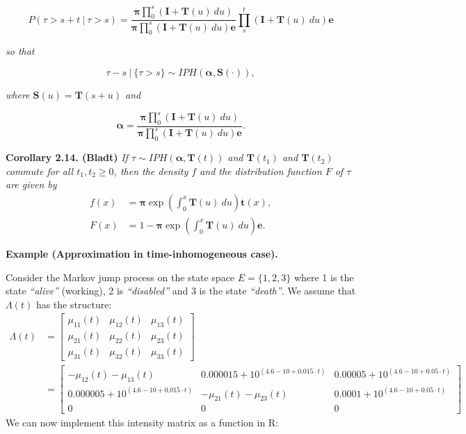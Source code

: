 \documentclass[a4paper,10pt,openany]{book}
\begin{document}
\[
P(\tau >s+t\ \vert\ \tau >s)=\frac{\mathbf{\pi}\prod_0^s(\mathbf{I}+\mathbf{T}(u)\ du)}{\mathbf{\pi}\prod_0^s(\mathbf{I}+\mathbf{T}(u)\ du)\mathbf{e}}\prod_s^t(\mathbf{I}+\mathbf{T}(u)\ du)\mathbf{e}
\]

\emph{so that}

\[
\tau-s\ \vert\ \{\tau>s\}\sim IPH(\mathbf{\alpha},\mathbf{S}(\cdot)),
\]

\emph{where \(\mathbf{S}(u)=\mathbf{T}(s+u)\) and }

\[
\mathbf{\alpha}=\frac{\mathbf{\pi}\prod_0^s(\mathbf{I}+\mathbf{T}(u)\ du)}{\mathbf{\pi}\prod_0^s(\mathbf{I}+\mathbf{T}(u)\ du)\mathbf{e}}.
\]

\textbf{Corollary 2.14. (Bladt)} \emph{If \(\tau\sim IPH(\mathbf{\alpha},\mathbf{T}(t))\) and \(\mathbf{T}(t_1)\) and \(\mathbf{T}(t_2)\) commute for all \(t_1,t_2\ge 0\), then the density \(f\) and the distribution function \(F\) of \(\tau\) are given by}
\begin{align*}
f(x)&=\mathbf{\pi}\exp\left(\int_0^x\mathbf{T}(u)\ du\right)\mathbf{t}(x),\\
F(x)&=1-\mathbf{\pi}\exp\left(\int_0^x\mathbf{T}(u)\ du\right)\mathbf{e}.
\end{align*}

\textbf{Example (Approximation in time-inhomogeneous case).}

Consider the Markov jump process on the state space \(E=\{1,2,3\}\) where 1 is the state \emph{``alive''} (working), 2 is \emph{``disabled''} and 3 is the state \emph{``death''}. We assume that \(\Lambda(t)\) has the structure:
\begin{align*}
\Lambda(t)&=\begin{bmatrix}
\mu_{11}(t) & \mu_{12}(t) & \mu_{13}(t)\\
\mu_{21}(t) & \mu_{22}(t) & \mu_{23}(t)\\
\mu_{31}(t) & \mu_{32}(t) & \mu_{33}(t)
\end{bmatrix}\\
&=
\begin{bmatrix}
-\mu_{12}(t)-\mu_{13}(t) &  0.000015 + 10^{(4.6-10+0.015\cdot t)} & 0.00005 + 10^{(4.6-10+0.05\cdot t)}\\
0.000005 + 10^{(4.6-10+0.015\cdot t)} & -\mu_{21}(t)-\mu_{23}(t) & 0.0001 + 10^{(4.6-10+0.05\cdot t)}\\
0 & 0 & 0
\end{bmatrix}
\end{align*}
We can now implement this intensity matrix as a function in R:
\end{document}
